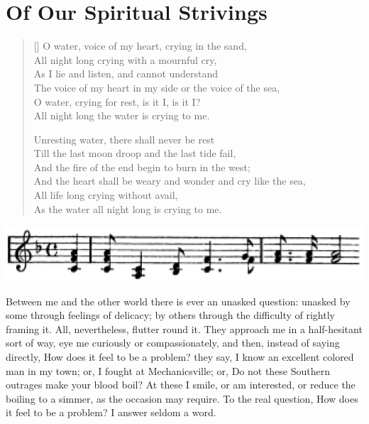 
\author{W. E. B. Du Bois}
\chapter{Of Our Spiritual Strivings}


\settowidth{}
\begin{verse}[\versewidth]
O water, voice of my heart, crying in the sand,\\
\vin All night long crying with a mournful cry,\\
As I lie and listen, and cannot understand\\
\vin\vin The voice of my heart in my side or the voice of the sea,\\
\vin O water, crying for rest, is it I, is it I?\\
\vin\vin All night long the water is crying to me.

Unresting water, there shall never be rest\\
\vin Till the last moon droop and the last tide fail,\\
And the fire of the end begin to burn in the west;\\
\vin\vin And the heart shall be weary and wonder and cry like the sea,\\
\vin All life long crying without avail,\\
\vin\vin As the water all night long is crying to me.
\end{verse}

\begin{center}
\includegraphics[width=\maxwidth]{texts/music.eps}
\end{center}

\noindent Between me and the other world there is ever an unasked
question: unasked by some through feelings of delicacy; by others
through the difficulty of rightly framing it. All, nevertheless,
flutter round it. They approach me in a half-hesitant sort of way, eye
me curiously or compassionately, and then, instead of saying directly,
How does it feel to be a problem? they say, I know an excellent
 colored man in my town; or, I fought at Mechanicsville; or,
Do not these Southern outrages make your blood boil? At these I smile,
or am interested, or reduce the boiling to a simmer, as the occasion
may require. To the real question, How does it feel to be a problem? I
answer seldom a word.


